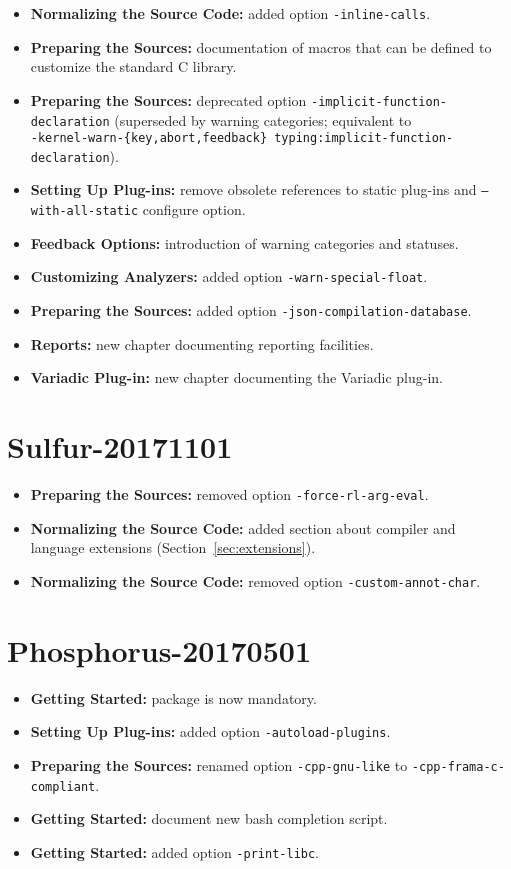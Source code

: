 \begin{itemize}
\item \textbf{Normalizing the Source Code:} added option \texttt{-inline-calls}.
\item \textbf{Preparing the Sources:} documentation of macros that can be
  defined to customize the standard C library.
\item \textbf{Preparing the Sources:} deprecated option
  \texttt{-implicit-function-declaration} (superseded by
  warning categories; equivalent to\\
  \texttt{-kernel-warn-\{key,abort,feedback\} typing:implicit-function-declaration}).
\item \textbf{Setting Up Plug-ins:} remove obsolete references
 to static plug-ins and \texttt{--with-all-static} configure option.
\item \textbf{Feedback Options:} introduction of warning categories and statuses.
\item \textbf{Customizing Analyzers:} added option \texttt{-warn-special-float}.
\item \textbf{Preparing the Sources:} added option
  \texttt{-json-compilation-database}.
\item \textbf{Reports:} new chapter documenting reporting facilities.
\item \textbf{Variadic Plug-in:} new chapter documenting the Variadic plug-in.
\end{itemize}

\section*{Sulfur-20171101}

\begin{itemize}
\item \textbf{Preparing the Sources:} removed option
  \texttt{-force-rl-arg-eval}.
\item \textbf{Normalizing the Source Code:} added section about compiler
  and language extensions (Section~\ref{sec:extensions}).
\item \textbf{Normalizing the Source Code:} removed option
  \texttt{-custom-annot-char}.
\end{itemize}

\section*{Phosphorus-20170501}

\begin{itemize}
\item \textbf{Getting Started:}  package is now mandatory.
\item \textbf{Setting Up Plug-ins:} added option \texttt{-autoload-plugins}.
\item \textbf{Preparing the Sources:} renamed option \texttt{-cpp-gnu-like}
  to \texttt{-cpp-frama-c-compliant}.
\item \textbf{Getting Started:} document new bash completion script.
\item \textbf{Getting Started:} added option \texttt{-print-libc}.
\end{itemize}

